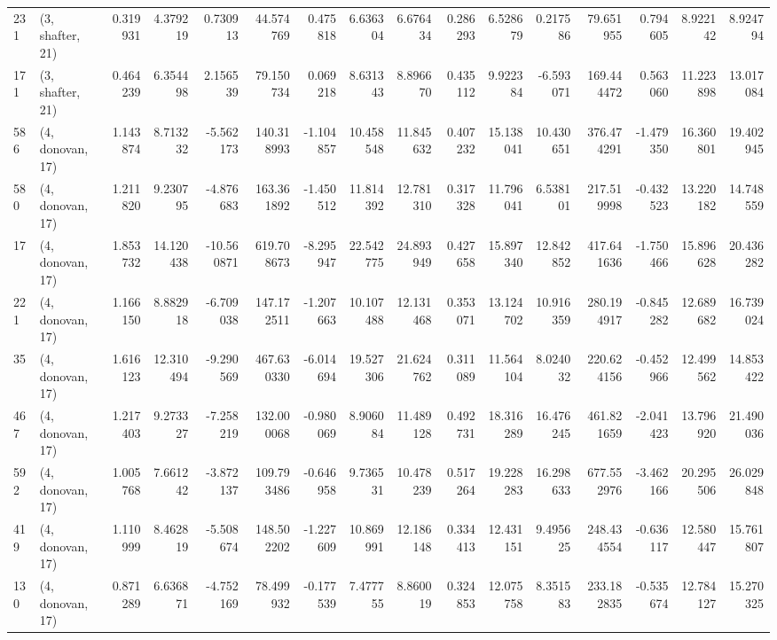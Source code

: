 \begin{tabular}{llrrrrrrrrrrrrrr}
231 &  (3, shafter, 21) &   0.319931 &   4.379219 &   0.730913 &    44.574769 &   0.475818 &   6.636304 &   6.676434 &  0.286293 &   6.528679 &   0.217586 &    79.651955 &  0.794605 &   8.922142 &   8.924794 \\
171 &  (3, shafter, 21) &   0.464239 &   6.354498 &   2.156539 &    79.150734 &   0.069218 &   8.631343 &   8.896670 &  0.435112 &   9.922384 &  -6.593071 &   169.444472 &  0.563060 &  11.223898 &  13.017084 \\
586 &  (4, donovan, 17) &   1.143874 &   8.713232 &  -5.562173 &   140.318993 &  -1.104857 &  10.458548 &  11.845632 &  0.407232 &  15.138041 &  10.430651 &   376.474291 & -1.479350 &  16.360801 &  19.402945 \\
580 &  (4, donovan, 17) &   1.211820 &   9.230795 &  -4.876683 &   163.361892 &  -1.450512 &  11.814392 &  12.781310 &  0.317328 &  11.796041 &   6.538101 &   217.519998 & -0.432523 &  13.220182 &  14.748559 \\
17  &  (4, donovan, 17) &   1.853732 &  14.120438 & -10.560871 &   619.708673 &  -8.295947 &  22.542775 &  24.893949 &  0.427658 &  15.897340 &  12.842852 &   417.641636 & -1.750466 &  15.896628 &  20.436282 \\
221 &  (4, donovan, 17) &   1.166150 &   8.882918 &  -6.709038 &   147.172511 &  -1.207663 &  10.107488 &  12.131468 &  0.353071 &  13.124702 &  10.916359 &   280.194917 & -0.845282 &  12.689682 &  16.739024 \\
35  &  (4, donovan, 17) &   1.616123 &  12.310494 &  -9.290569 &   467.630330 &  -6.014694 &  19.527306 &  21.624762 &  0.311089 &  11.564104 &   8.024032 &   220.624156 & -0.452966 &  12.499562 &  14.853422 \\
467 &  (4, donovan, 17) &   1.217403 &   9.273327 &  -7.258219 &   132.000068 &  -0.980069 &   8.906084 &  11.489128 &  0.492731 &  18.316289 &  16.476245 &   461.821659 & -2.041423 &  13.796920 &  21.490036 \\
592 &  (4, donovan, 17) &   1.005768 &   7.661242 &  -3.872137 &   109.793486 &  -0.646958 &   9.736531 &  10.478239 &  0.517264 &  19.228283 &  16.298633 &   677.552976 & -3.462166 &  20.295506 &  26.029848 \\
419 &  (4, donovan, 17) &   1.110999 &   8.462819 &  -5.508674 &   148.502202 &  -1.227609 &  10.869991 &  12.186148 &  0.334413 &  12.431151 &   9.495625 &   248.434554 & -0.636117 &  12.580447 &  15.761807 \\
130 &  (4, donovan, 17) &   0.871289 &   6.636871 &  -4.752169 &    78.499932 &  -0.177539 &   7.477755 &   8.860019 &  0.324853 &  12.075758 &   8.351583 &   233.182835 & -0.535674 &  12.784127 &  15.270325 \\

\end{tabular}
